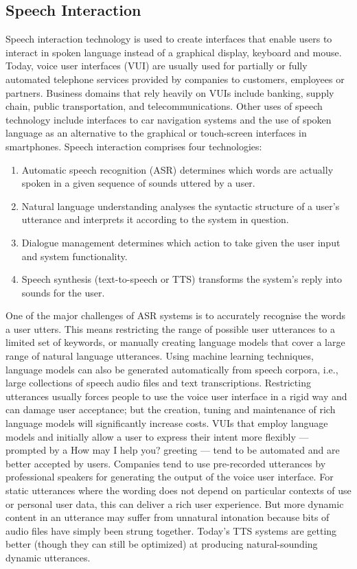 \documentclass[]{../metanetpaper}
\begin{document}
	\subsection{Speech Interaction}
Speech interaction technology is used to create interfaces that enable users to interact in spoken language instead of a graphical display, keyboard and mouse. Today, voice user interfaces (VUI) are usually used for partially or fully automated telephone services provided by companies to customers, employees or partners. Business domains that rely heavily on VUIs include banking, supply chain, public transportation, and telecommunications. Other uses of speech technology include interfaces to car navigation systems and the use of spoken language as an alternative to the graphical or touch-screen interfaces in smartphones. 
Speech interaction comprises four technologies:
\begin{enumerate}
\item Automatic speech recognition (ASR) determines which words are actually spoken in a given sequence of sounds uttered by a user.
\item Natural language understanding analyses the syntactic structure of a user’s utterance and interprets it according to the system in question.
\item Dialogue management determines which action to take given the user input and system functionality.
\item Speech synthesis (text-to-speech or TTS) transforms the system’s reply into sounds for the user.
\end{enumerate}
One of the major challenges of ASR systems is to accurately recognise the words a user utters. This means restricting the range of possible user utterances to a limited set of keywords, or manually creating language models that cover a large range of natural language utterances. Using machine learning techniques, language models can also be generated automatically from speech corpora, i.e., large collections of speech audio files and text transcriptions. Restricting utterances usually forces people to use the voice user interface in a rigid way and can damage user acceptance; but the creation, tuning and maintenance of rich language models will significantly increase costs. VUIs that employ language models and initially allow a user to express their intent more flexibly — prompted by a How may I help you? greeting — tend to be automated and are better accepted by users. 
Companies tend to use pre-recorded utterances by professional speakers for generating the output of the voice user interface. For static utterances where the wording does not depend on particular contexts of use or personal user data, this can deliver a rich user experience. But more dynamic content in an utterance may suffer from unnatural intonation because bits of audio files have simply been strung together. Today’s TTS systems are getting better (though they can still be optimized) at producing natural-sounding dynamic utterances.  
\end{document}

